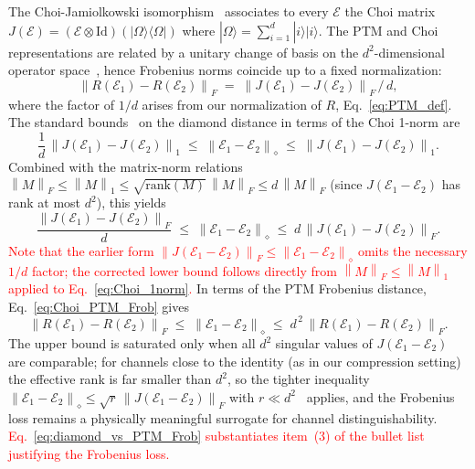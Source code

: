 \documentclass[%
 reprint,
superscriptaddress,
 amsmath,amssymb,
 aps,
]{revtex4-2}
\newcommand{\E}{\mathcal{E}}
\newcommand{\norm}[1]{\left\lVert#1\right\rVert}
\newcommand{\todoflag}[1]{\textcolor{red}{#1}}%
\begin{document}
The Choi-Jamiolkowski isomorphism~\cite{choi1975positive,jamiolkowski1972linear} associates to every $\E$ the Choi matrix $J(\E) = (\E\otimes\mathrm{Id})(|\Omega\rangle\langle\Omega|)$ where $|\Omega\rangle=\sum_{i=1}^d|i\rangle|i\rangle$. The PTM and Choi representations are related by a unitary change of basis on the $d^2$-dimensional operator space~\cite{greenbaum2015gst}, hence Frobenius norms coincide up to a fixed normalization:
\begin{equation}
    \norm{R(\E_1)-R(\E_2)}_F \;=\; \norm{J(\E_1)-J(\E_2)}_F\,/\,d,
    \label{eq:Choi_PTM_Frob}
\end{equation}
where the factor of $1/d$ arises from our normalization of $R$, Eq.~\eqref{eq:PTM_def}. The standard bounds~\cite{watrous2018theory,gilchrist2005distance} on the diamond distance in terms of the Choi 1-norm are
\begin{equation}
    \frac{1}{d}\,\norm{J(\E_1)-J(\E_2)}_1 \;\le\; \norm{\E_1-\E_2}_\diamond \;\le\; \norm{J(\E_1)-J(\E_2)}_1.
    \label{eq:Choi_1norm}
\end{equation}
Combined with the matrix-norm relations $\norm{M}_F \le \norm{M}_1 \le \sqrt{\mathrm{rank}(M)}\,\norm{M}_F \le d\,\norm{M}_F$ (since $J(\E_1-\E_2)$ has rank at most $d^2$), this yields
\begin{equation}
    \boxed{\;\frac{\norm{J(\E_1)-J(\E_2)}_F}{d} \;\le\; \norm{\E_1-\E_2}_\diamond \;\le\; d\,\norm{J(\E_1)-J(\E_2)}_F.\;}
    \label{eq:diamond_vs_Frob}
\end{equation}
\todoflag{Note that the earlier form $\norm{J(\E_1-\E_2)}_F \le \norm{\E_1-\E_2}_\diamond$ omits the necessary $1/d$ factor; the corrected lower bound follows directly from $\norm{M}_F\le\norm{M}_1$ applied to Eq.~\eqref{eq:Choi_1norm}.} In terms of the PTM Frobenius distance, Eq.~\eqref{eq:Choi_PTM_Frob} gives
\begin{equation}
    \norm{R(\E_1)-R(\E_2)}_F \;\le\; \norm{\E_1-\E_2}_\diamond \;\le\; d^{\,2}\,\norm{R(\E_1)-R(\E_2)}_F.
    \label{eq:diamond_vs_PTM_Frob}
\end{equation}
The upper bound is saturated only when all $d^2$ singular values of $J(\E_1-\E_2)$ are comparable; for channels close to the identity (as in our compression setting) the effective rank is far smaller than $d^2$, so the tighter inequality $\norm{\E_1-\E_2}_\diamond \le \sqrt{r}\,\norm{J(\E_1-\E_2)}_F$ with $r\ll d^2$~\cite{watrous2018theory} applies, and the Frobenius loss remains a physically meaningful surrogate for channel distinguishability. \todoflag{Eq.~\eqref{eq:diamond_vs_PTM_Frob} substantiates item~(3) of the bullet list justifying the Frobenius loss.}
\end{document}
